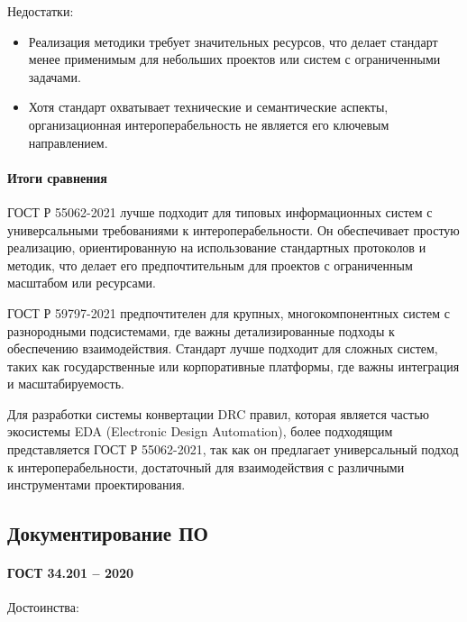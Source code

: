 Недостатки:

\begin{itemize}
	\item Реализация методики требует значительных ресурсов,
		что делает стандарт менее применимым для небольших проектов
		или систем с ограниченными задачами.
	\item Хотя стандарт охватывает технические и семантические аспекты,
		организационная интероперабельность
		не является его ключевым направлением.
\end{itemize}

\paragraph{Итоги сравнения}

ГОСТ Р 55062-2021 лучше подходит для типовых информационных систем
с универсальными требованиями к интероперабельности.
Он обеспечивает простую реализацию,
ориентированную на использование стандартных протоколов и методик,
что делает его предпочтительным
для проектов с ограниченным масштабом или ресурсами.

ГОСТ Р 59797-2021 предпочтителен для крупных,
многокомпонентных систем с разнородными подсистемами,
где важны детализированные подходы к обеспечению взаимодействия.
Стандарт лучше подходит для сложных систем,
таких как государственные или корпоративные платформы,
где важны интеграция и масштабируемость.

Для разработки системы конвертации DRC правил,
которая является частью экосистемы EDA (Electronic Design Automation),
более подходящим представляется ГОСТ Р 55062-2021,
так как он предлагает универсальный подход к интероперабельности,
достаточный для взаимодействия с различными инструментами проектирования.

\subsection{Документирование ПО}

\paragraph{ГОСТ 34.201 -- 2020}

Достоинства:

